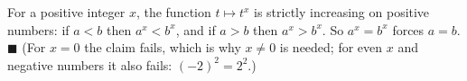 For a positive integer $x$, the function $t\mapsto t^x$ is strictly increasing on positive numbers: if $a<b$ then $a^x<b^x$, and if $a>b$ then $a^x>b^x$. So $a^x=b^x$ forces $a=b$. $\blacksquare$ (For $x=0$ the claim fails, which is why $x\ne0$ is needed; for even $x$ and negative numbers it also fails: $(-2)^2=2^2$.)
